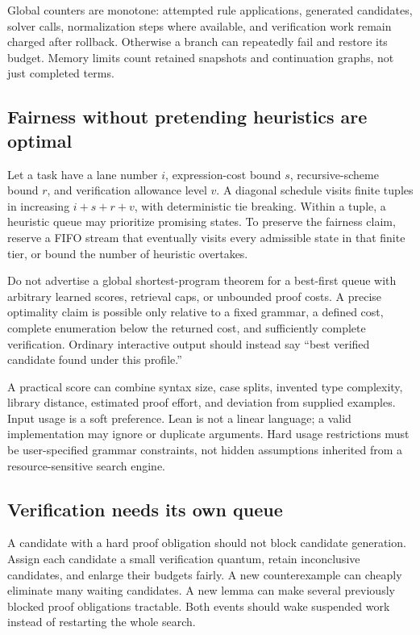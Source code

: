 Global counters are monotone: attempted rule applications, generated candidates, solver calls, normalization steps where available, and verification work remain charged after rollback. Otherwise a branch can repeatedly fail and restore its budget. Memory limits count retained snapshots and continuation graphs, not just completed terms.

\subsection{Fairness without pretending heuristics are optimal}

Let a task have a lane number $i$, expression-cost bound $s$, recursive-scheme bound $r$, and verification allowance level $v$. A diagonal schedule visits finite tuples in increasing $i+s+r+v$, with deterministic tie breaking. Within a tuple, a heuristic queue may prioritize promising states. To preserve the fairness claim, reserve a FIFO stream that eventually visits every admissible state in that finite tier, or bound the number of heuristic overtakes.

Do not advertise a global shortest-program theorem for a best-first queue with arbitrary learned scores, retrieval caps, or unbounded proof costs. A precise optimality claim is possible only relative to a fixed grammar, a defined cost, complete enumeration below the returned cost, and sufficiently complete verification. Ordinary interactive output should instead say ``best verified candidate found under this profile.''

A practical score can combine syntax size, case splits, invented type complexity, library distance, estimated proof effort, and deviation from supplied examples. Input usage is a soft preference. Lean is not a linear language; a valid implementation may ignore or duplicate arguments. Hard usage restrictions must be user-specified grammar constraints, not hidden assumptions inherited from a resource-sensitive search engine.

\subsection{Verification needs its own queue}

A candidate with a hard proof obligation should not block candidate generation. Assign each candidate a small verification quantum, retain inconclusive candidates, and enlarge their budgets fairly. A new counterexample can cheaply eliminate many waiting candidates. A new lemma can make several previously blocked proof obligations tractable. Both events should wake suspended work instead of restarting the whole search.

